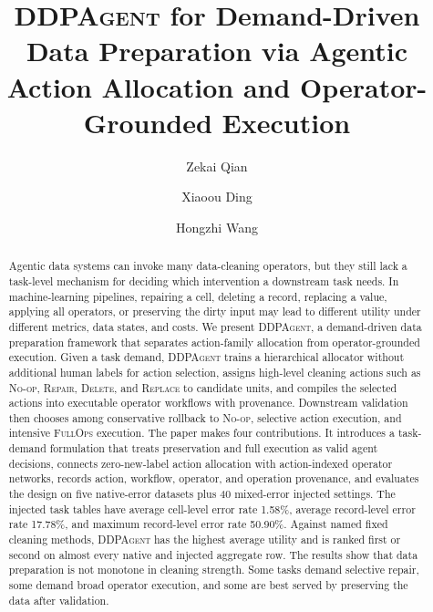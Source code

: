 \documentclass[sigconf, nonacm]{acmart}
\newcommand{\sys}{\textsc{DDPAgent}\xspace}
\newcommand{\noop}{\textsc{No-op}\xspace}
\newcommand{\repair}{\textsc{Repair}\xspace}
\newcommand{\deleteop}{\textsc{Delete}\xspace}
\newcommand{\replaceop}{\textsc{Replace}\xspace}
\newcommand{\fullops}{\textsc{FullOps}\xspace}
\begin{document}
\title{\sys for Demand-Driven Data Preparation via Agentic Action Allocation and Operator-Grounded Execution}

\author{Zekai Qian}

\author{Xiaoou Ding}

\author{Hongzhi Wang}

\begin{abstract}
Agentic data systems can invoke many data-cleaning operators, but they still lack a task-level mechanism for deciding which intervention a downstream task needs. In machine-learning pipelines, repairing a cell, deleting a record, replacing a value, applying all operators, or preserving the dirty input may lead to different utility under different metrics, data states, and costs.
We present \sys, a demand-driven data preparation framework that separates action-family allocation from operator-grounded execution. Given a task demand, \sys trains a hierarchical allocator without additional human labels for action selection, assigns high-level cleaning actions such as \noop, \repair, \deleteop, and \replaceop to candidate units, and compiles the selected actions into executable operator workflows with provenance. Downstream validation then chooses among conservative rollback to \noop, selective action execution, and intensive \fullops execution.
The paper makes four contributions. It introduces a task-demand formulation that treats preservation and full execution as valid agent decisions, connects zero-new-label action allocation with action-indexed operator networks, records action, workflow, operator, and operation provenance, and evaluates the design on five native-error datasets plus 40 mixed-error injected settings. The injected task tables have average cell-level error rate 1.58\%, average record-level error rate 17.78\%, and maximum record-level error rate 50.90\%. Against named fixed cleaning methods, \sys has the highest average utility and is ranked first or second on almost every native and injected aggregate row. The results show that data preparation is not monotone in cleaning strength. Some tasks demand selective repair, some demand broad operator execution, and some are best served by preserving the data after validation.
\end{abstract}
\end{document}
